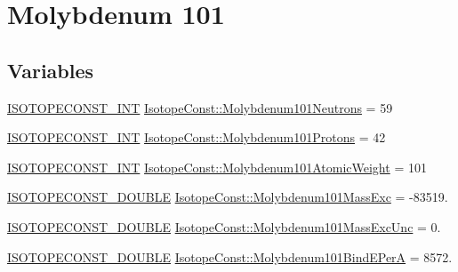 \hypertarget{group___isotope_const-_molybdenum-_mo101}{}\section{Molybdenum 101}
\label{group___isotope_const-_molybdenum-_mo101}
\subsection*{Variables}
\begin{DoxyCompactItemize}
\item 
\mbox{\hyperlink{group___isotope_const-_macros_ga5f18360b3e99483a35c32d789e62621c}{I\+S\+O\+T\+O\+P\+E\+C\+O\+N\+S\+T\+\_\+\+I\+NT}} \mbox{\hyperlink{group___isotope_const-_molybdenum-_mo101_ga02e47704c892d691b3e7323a0b610c54}{Isotope\+Const\+::\+Molybdenum101\+Neutrons}} = 59
\item 
\mbox{\hyperlink{group___isotope_const-_macros_ga5f18360b3e99483a35c32d789e62621c}{I\+S\+O\+T\+O\+P\+E\+C\+O\+N\+S\+T\+\_\+\+I\+NT}} \mbox{\hyperlink{group___isotope_const-_molybdenum-_mo101_ga37279a11b4efad6fb01d7d1d4c9f90ba}{Isotope\+Const\+::\+Molybdenum101\+Protons}} = 42
\item 
\mbox{\hyperlink{group___isotope_const-_macros_ga5f18360b3e99483a35c32d789e62621c}{I\+S\+O\+T\+O\+P\+E\+C\+O\+N\+S\+T\+\_\+\+I\+NT}} \mbox{\hyperlink{group___isotope_const-_molybdenum-_mo101_ga8c59c7b254f362a473f9b008ff7b05b6}{Isotope\+Const\+::\+Molybdenum101\+Atomic\+Weight}} = 101
\item 
\mbox{\hyperlink{group___isotope_const-_macros_ga8f45a7272ce02c0b4c65c44636ed719a}{I\+S\+O\+T\+O\+P\+E\+C\+O\+N\+S\+T\+\_\+\+D\+O\+U\+B\+LE}} \mbox{\hyperlink{group___isotope_const-_molybdenum-_mo101_ga9f8ccffff6e2e210c52c1cb982975516}{Isotope\+Const\+::\+Molybdenum101\+Mass\+Exc}} = -\/83519.
\item 
\mbox{\hyperlink{group___isotope_const-_macros_ga8f45a7272ce02c0b4c65c44636ed719a}{I\+S\+O\+T\+O\+P\+E\+C\+O\+N\+S\+T\+\_\+\+D\+O\+U\+B\+LE}} \mbox{\hyperlink{group___isotope_const-_molybdenum-_mo101_gad562221323f5782b2936a68812bae9f7}{Isotope\+Const\+::\+Molybdenum101\+Mass\+Exc\+Unc}} = 0.
\item 
\mbox{\hyperlink{group___isotope_const-_macros_ga8f45a7272ce02c0b4c65c44636ed719a}{I\+S\+O\+T\+O\+P\+E\+C\+O\+N\+S\+T\+\_\+\+D\+O\+U\+B\+LE}} \mbox{\hyperlink{group___isotope_const-_molybdenum-_mo101_gab9e6215c45f4b5259be2ffe60035d086}{Isotope\+Const\+::\+Molybdenum101\+Bind\+E\+PerA}} = 8572.

\end{DoxyCompactItemize}
